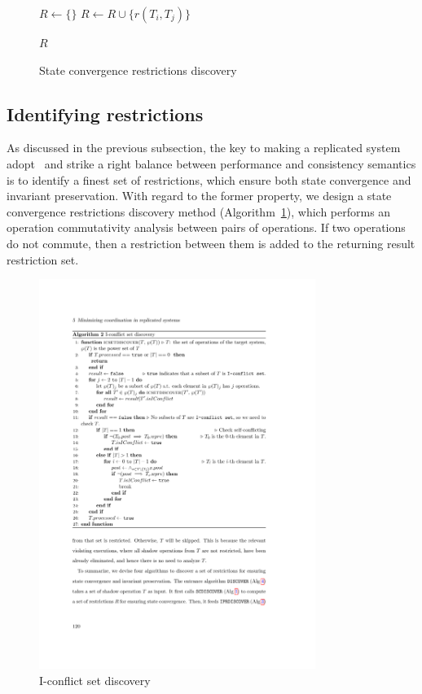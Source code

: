 \begin{figure}[th!]
\caption{State convergence restrictions discovery}
\label{alg:scdiscover}
\begin{algorithmic}[1]
\STATE $R \leftarrow \{ \}$ 
     \STATE $R \leftarrow R \cup \{r(T_i, T_j)\}$
    \ENDIF
 \ENDFOR
\ENDFOR

\RETURN $R$
\EndFunction
\end{algorithmic}
\end{figure}
\fi 
\subsection{Identifying restrictions}
\label{ch:por:sect:identify}
As discussed in the previous subsection, the key to making a replicated system
adopt \PRCN\ and strike a right balance between performance and consistency semantics
is to identify a finest set of restrictions, which ensure both state convergence
and invariant preservation. With regard to the former property, we design a state convergence
restrictions discovery method (Algorithm~\ref{alg:scdiscover}), which
performs an operation commutativity analysis between pairs of operations. If
two operations do not commute, then a restriction between them is added to the returning
result restriction set.

\begin{figure}[th!]
\centering
\includegraphics[width=0.8\textwidth]{figures/algs/alg2.pdf}
\caption{I-conflict set discovery}
\label{alg:iconflictassess}
\end{figure}



